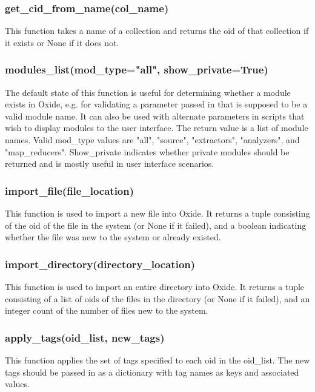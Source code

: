 \documentclass{book}
\begin{document}
\subsubsection{get\_cid\_from\_name(col\_name)}

This function takes a name of a collection and returns the oid of that collection if it exists or None if it does not.
    
\subsubsection{modules\_list(mod\_type="all", show\_private=True)}

The default state of this function is useful for determining whether a module exists in Oxide, e.g. for validating a parameter passed in that is supposed to be a valid module name.  It can also be used with alternate parameters in scripts that wish to display modules to the user interface.  The return value is a list of module names.  Valid mod\_type values are "all", "source", "extractors", "analyzers", and "map\_reducers".  Show\_private indicates whether private modules should be returned and is mostly useful in user interface scenarios.         

\subsubsection{import\_file(file\_location)}

This function is used to import a new file into Oxide.  It returns a tuple consisting of the oid of the file in the system (or None if it failed), and a boolean indicating whether the file was new to the system or already existed.

\subsubsection{import\_directory(directory\_location)}

This function is used to import an entire directory into Oxide.  It returns a tuple consisting of a list of oids of the files in the directory (or None if it failed), and an integer count of the number of files new to the system.
          
\subsubsection{apply\_tags(oid\_list, new\_tags)}

This function applies the set of tags specified to each oid in the oid\_list.  The new tags should be passed in as a dictionary with tag names as keys and associated values. 
          
\end{document}
